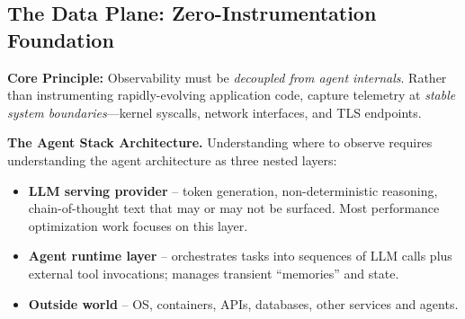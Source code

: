 \documentclass[sigplan,screen，review,9pt]{acmart}
\begin{document}
\subsection{The Data Plane: Zero-Instrumentation Foundation}

\textbf{Core Principle:} Observability must be \emph{decoupled from agent internals}. Rather than instrumenting rapidly-evolving application code, capture telemetry at \emph{stable system boundaries}—kernel syscalls, network interfaces, and TLS endpoints.

\textbf{The Agent Stack Architecture.} Understanding where to observe requires understanding the agent architecture as three nested layers:


\begin{comment}
    

\begin{center}
    
\begin{Verbatim}[fontsize=\small, commandchars=\\\{\}]
┌───────────────────────────────────────────────┐
│          ☁  Rest of workspace / system       │
│  (APIs, DBs, message bus, OS, Kubernetes…)    │
│                                               │
│   ┌───────────────────────────────────────┐   │
│   │       Agent runtime / framework       │   │
│   │ (LangChain, claude-code, gemini-cli …)│   │
│   │  • orchestrates prompts & tool calls  │   │
│   │  • owns scratch memory / vector DB    │   │
│   └───────────────────────────────────────┘   │
│               ↑ outbound API calls            │
│───────────────────────────────────────────────│
│               ↓ inbound events                │
│   ┌───────────────────────────────────────┐   │
│   │          LLM serving provider         │   │
│   │    (OpenAI endpoint, local llama.cpp) │   │
│   └───────────────────────────────────────┘   │
└───────────────────────────────────────────────┘
\end{Verbatim}
\end{center}
\end{comment}


\begin{itemize}
  \item \textbf{LLM serving provider} – token generation, non-deterministic reasoning, chain-of-thought text that may or may not be surfaced. Most performance optimization work focuses on this layer.
  \item \textbf{Agent runtime layer} – orchestrates tasks into sequences of LLM calls plus external tool invocations; manages transient ``memories'' and state.
  \item \textbf{Outside world} – OS, containers, APIs, databases, other services and agents.
\end{itemize}
\end{document}
